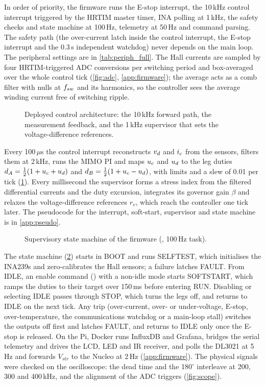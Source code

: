 In order of priority, the firmware runs the E-stop interrupt, the 10\,kHz control interrupt triggered by the HRTIM master timer, INA polling at 1\,kHz, the safety checks and state machine at 100\,Hz, telemetry at 50\,Hz and command parsing. The safety path (the over-current latch inside the control interrupt, the E-stop interrupt and the 0.3\,s independent watchdog) never depends on the main loop. The peripheral settings are in \cref{tab:periph_full}. The Hall currents are sampled by four HRTIM-triggered ADC conversions per switching period and box-averaged over the whole control tick (\cref{fig:adc}, \cref{app:firmware}); the average acts as a comb filter with nulls at $f_{sw}$ and its harmonics, so the controller sees the average winding current free of switching ripple.

\begin{figure}[htbp]
  \centering
  
  \caption[{Deployed control architecture}]{Deployed control architecture: the 10\,kHz forward path, the measurement feedback, and the 1\,kHz supervisor that sets the voltage-difference references.}
  \label{fig:ctrlloop}
\end{figure}

Every 100\,$\mu$s the control interrupt reconstructs $v_{d}$ and $i_{c}$ from the sensors, filters them at 2\,kHz, runs the MIMO PI and maps $u_{c}$ and $u_{d}$ to the leg duties $d_A = \tfrac12(1+u_{c}+u_{d})$ and $d_B = \tfrac12(1+u_{c}-u_{d})$, with limits and a slew of 0.01 per tick (\cref{fig:ctrlloop}). Every millisecond the supervisor forms a stress index from the filtered differential currents and the duty excursion, integrates its governor gain $\beta$ and relaxes the voltage-difference references $r_v$, which reach the controller one tick later. The pseudocode for the interrupt, soft-start, supervisor and state machine is in \cref{app:pseudo}.

\begin{figure}[htbp]
  \centering
  
  \caption{Supervisory state machine of the firmware (, 100\,Hz task).}
  \label{fig:fsm}
\end{figure}

The state machine (\cref{fig:fsm}) starts in BOOT and runs SELFTEST, which initialises the INA239s and zero-calibrates the Hall sensors; a failure latches FAULT. From IDLE, an enable command () with a non-idle mode starts SOFTSTART, which ramps the duties to their target over 150\,ms before entering RUN. Disabling or selecting IDLE passes through STOP, which turns the legs off, and returns to IDLE on the next tick. Any trip (over-current, over- or under-voltage, E-stop, over-temperature, the communications watchdog or a main-loop stall) switches the outputs off first and latches FAULT, and  returns to IDLE only once the E-stop is released.
On the Pi, Docker runs InfluxDB and Grafana,  bridges the serial telemetry and drives the LCD, LED and IR receiver, and  polls the DL3021 at 5\,Hz and forwards $V_{str}$ to the Nucleo at 2\,Hz (\cref{app:firmware}). The physical signals were checked on the oscilloscope: the dead time and the 180$^\circ$ interleave at 200, 300 and 400\,kHz, and the alignment of the ADC triggers (\cref{fig:scope}).

